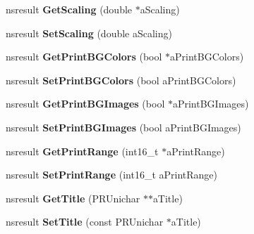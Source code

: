 \begin{DoxyCompactItemize}
nsresult {\bfseries Get\+Scaling} (double $\ast$a\+Scaling)
\item 
\mbox{\label{interfacens_i_print_settings_a7cda9c924282fb1be7c7ccfa3207a379}} 
nsresult {\bfseries Set\+Scaling} (double a\+Scaling)
\item 
\mbox{\label{interfacens_i_print_settings_a6cbae80643e042d30026cf78ef47bd56}} 
nsresult {\bfseries Get\+Print\+B\+G\+Colors} (bool $\ast$a\+Print\+B\+G\+Colors)
\item 
\mbox{\label{interfacens_i_print_settings_a842a8af632c0b399cf4549fc673f31a9}} 
nsresult {\bfseries Set\+Print\+B\+G\+Colors} (bool a\+Print\+B\+G\+Colors)
\item 
\mbox{\label{interfacens_i_print_settings_ab7175842d90f37a869c14e9687d7248a}} 
nsresult {\bfseries Get\+Print\+B\+G\+Images} (bool $\ast$a\+Print\+B\+G\+Images)
\item 
\mbox{\label{interfacens_i_print_settings_acb2105bf7b18f2476274d018a71a98b0}} 
nsresult {\bfseries Set\+Print\+B\+G\+Images} (bool a\+Print\+B\+G\+Images)
\item 
\mbox{\label{interfacens_i_print_settings_a15e23cebb6a39b3f22fe33cafd62cbc5}} 
nsresult {\bfseries Get\+Print\+Range} (int16\+\_\+t $\ast$a\+Print\+Range)
\item 
\mbox{\label{interfacens_i_print_settings_a46c941fa9ccb148e076a3c33fcff25c2}} 
nsresult {\bfseries Set\+Print\+Range} (int16\+\_\+t a\+Print\+Range)
\item 
\mbox{\label{interfacens_i_print_settings_a00140ff302b6e93ad03b1628f8d3ad42}} 
nsresult {\bfseries Get\+Title} (P\+R\+Unichar $\ast$$\ast$a\+Title)
\item 
\mbox{\label{interfacens_i_print_settings_a0f2742eb71c986c723ffa15d46a72599}} 
nsresult {\bfseries Set\+Title} (const P\+R\+Unichar $\ast$a\+Title)
\item 
\mbox{\label{interfacens_i_print_settings_ae4fed535e6e567a6d403516f590aecaf}} 
$$
\end{DoxyCompactItemize}
